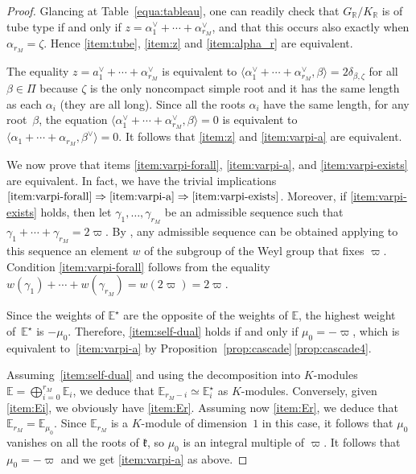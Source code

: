 \documentclass[JEP,XML,SOM,Unicode,NoFloatCountersInSection]{cedram}
\let\oldvee\vee
\renewcommand{\vee}{{\scriptscriptstyle\oldvee}}
\newcommand{\citestar}[3]{\cite[#3]{#1}}
\theoremstyle{plain}
\theoremstyle{definition}
\newcommand{\bE}{\mathbb{E}}
\newcommand{\bR}{\mathbb{R}}
\newcommand{\fk}{\mathfrak{k}}
\newcommand{\suma}[1]{\alpha_1^\vee + \cdots + \alpha_{#1}^\vee}
\newcommand{\rkm}{{r_M}}
\newcommand{\scal}[1]{\langle #1 \rangle}
\begin{document}
\begin{proof}
Glancing at Table~\ref{equa:tableau}, one can readily
check that $G_\bR / K_\bR$ is of tube type if and only if $z=\alpha_1^\vee + \cdots + \alpha_\rkm^\vee$,
and that this occurs also exactly when $\alpha_\rkm=\zeta$. Hence \eqref{item:tube}, \eqref{item:z} and
\eqref{item:alpha_r} are equivalent.

The equality $z=a_1^\vee+\cdots+\alpha_\rkm^\vee$ is equivalent to $\scal{\suma{\rkm},\beta} = 2
\delta_{\beta,\zeta}$ for all
$\beta\in\Pi$ because $\zeta$ is the only noncompact simple root and it has the same length as each
$\alpha_i$ (they are all long).
Since all the roots $\alpha_i$ have the same length, for any root~$\beta$,
the equation $\scal{\suma{\rkm},\beta}=0$ is equivalent to
$\scal{\alpha_1 + \cdots + \alpha_\rkm,\beta^\vee}=0$. It follows that \eqref{item:z} and \eqref{item:varpi-a}
are equivalent.

We now prove that items \eqref{item:varpi-forall}, \eqref{item:varpi-a}, and
\eqref{item:varpi-exists} are equivalent. In fact, we have the trivial implications
$\eqref{item:varpi-forall} \Rightarrow \eqref{item:varpi-a} \Rightarrow \eqref{item:varpi-exists}$. Moreover, if
\eqref{item:varpi-exists} holds, then let $\gamma_1,\ldots,\gamma_\rkm$ be an admissible sequence
such that $\gamma_1+\cdots+\gamma_\rkm = 2\varpi$. By \citestar{richardson}*{Th.\,2.1}, any admissible
sequence can be obtained applying to this sequence an element $w$ of the subgroup of the Weyl group
that fixes $\varpi$.
Condition \eqref{item:varpi-forall} follows from the equality $w(\gamma_1)+\cdots+w(\gamma_\rkm)=w(2\varpi)=2\varpi$.

Since the weights of $\bE^\star$ are the opposite of the weights of $\bE$, the highest
weight of~$\bE^\star$ is $-\mu_0$. Therefore, \eqref{item:self-dual} holds if and only if
$\mu_0=-\varpi$, which is equivalent to~\eqref{item:varpi-a} by Proposition~\ref{prop:cascade}\,\eqref{prop:cascade4}.

Assuming~\eqref{item:self-dual} and using the decomposition into $K$-modules $\bE =
\bigoplus_{i=0}^{\rkm} \bE_i$, we deduce that
$\bE_{\rkm-i} \simeq \bE_{i}^\star$ as $K$-modules. Conversely, given \eqref{item:Ei}, we obviously
have \eqref{item:Er}.
Assuming now \eqref{item:Er}, we deduce that $\bE_\rkm=\bE_{\mu_0}$. Since $\bE_{\rkm}$ is a
$K$-module of dimension~$1$ in this
case, it follows that $\mu_0$ vanishes on all the roots of $\fk$, so $\mu_0$ is an integral
multiple of $\varpi$. It follows
that $\mu_0=-\varpi$ and we get \eqref{item:varpi-a} as above.
\end{proof}
\end{document}
